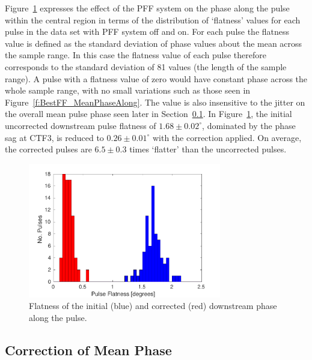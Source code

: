 Figure~\ref{f:BestFF_Flatness} expresses the effect of the PFF system on the phase along the pulse within the central region in terms of the distribution of `flatness' values for each pulse in the data set with PFF system off and on. For each pulse the flatness value is defined as the standard deviation of phase values about the mean across the sample range. In this case the flatness value of each pulse therefore corresponds to the standard deviation of 81 values (the length of the sample range). A pulse with a flatness value of zero would have constant phase across the whole sample range, with no small variations such as those seen in Figure~\ref{f:BestFF_MeanPhaseAlong}. The value is also insensitive to the jitter on the overall mean pulse phase seen later in Section~\ref{ss:bestMeanJitter}. In Figure~\ref{f:BestFF_Flatness}, the initial uncorrected downstream pulse flatness of \(1.68\pm0.02^\circ\), dominated by the phase sag at CTF3, is reduced to \(0.26\pm0.01^\circ\) with the correction applied. On average, the corrected pulses are \(6.5\pm0.3\) times `flatter' than the uncorrected pulses.

\begin{figure}
  \centering
  \includegraphics[width=0.75\textwidth]{Figures/feedforward/BestFF_Flatness}
  \caption{Flatness of the initial (blue) and corrected (red) downstream phase along the pulse.}
  \label{f:BestFF_Flatness}
\end{figure}

\subsection{Correction of Mean Phase}
\label{ss:bestMeanJitter}

